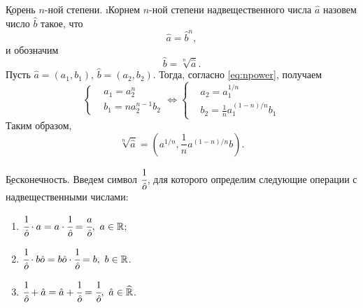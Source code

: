 \b{Корень $n$-ной степени.} \i{Корнем $n$-ной степени} надвещественного числа $\hat{a}$ назовем число $\hat{b}$ такое, что 
	$$\hat{a}=\hat{b}^n,$$
и обозначим
	$$\hat{b}=\sqrt[n]{\hat{a}}.$$
Пусть $\hat{a}=(a_1, b_1)$, $\hat{b}=(a_2, b_2)$. Тогда, согласно \eqref{eq:npower}, получаем
	$$\left\{
			\begin{aligned}
				& a_1=a_2^n \\
				& b_1=na_2^{n-1}b_2
			\end{aligned}
		\right.
		\Leftrightarrow
		\left\{
			\begin{aligned}
				& a_2=a_1^{1/n} \\
				& b_2=\frac{1}{n}a_1^{(1-n)/n}b_1
			\end{aligned}
		\right.
	$$
Таким образом,
	\begin{equation}
		\sqrt[n]{\hat{a}}=\left(a^{1/n}, \frac{1}{n}a^{(1-n)/n}b\right).
	\end{equation}

\b{Бесконечность.} Введем символ $\cfrac{1}{\hat{o}}$, для которого определим следующие операции с надвещественными числами:
\begin{enumerate}
	\item $\cfrac{1}{\hat{o}}\cdot a=a\cdot\cfrac{1}{\hat{o}}=\cfrac{a}{\hat{o}},\,\,a\in\mathbb{R}$;
	\item $\cfrac{1}{\hat{o}}\cdot b\hat{o}=b\hat{o}\cdot\cfrac{1}{\hat{o}}=b,\,\,b\in\mathbb{R}$.
	\item $\cfrac{1}{\hat{o}}+\hat{a}=\hat{a}+\cfrac{1}{\hat{o}}=\cfrac{1}{\hat{o}},\,\,\hat{a}\in\widehat{\mathbb{R}}$.
\end{enumerate}
